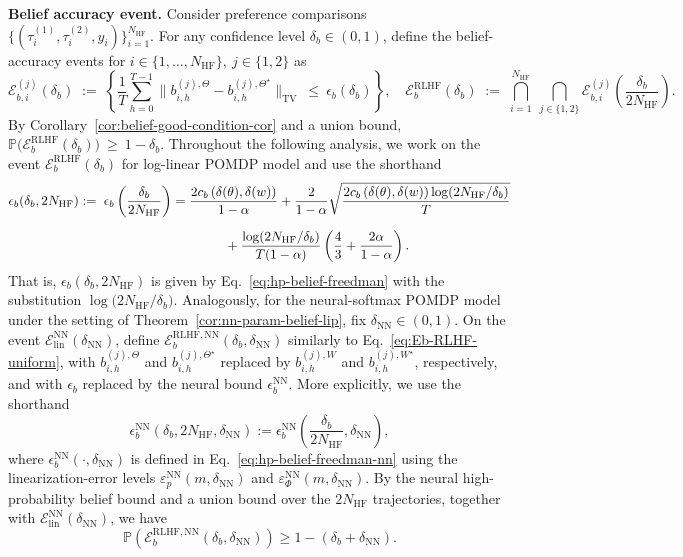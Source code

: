 \documentclass[10pt]{article} %
\theoremstyle{plain}
\theoremstyle{definition}
\theoremstyle{remark}
\newcommand{\bP}{\mathbb{P}}
\begin{document}
\textbf{Belief accuracy event.}
Consider preference comparisons $\{(\tau_i^{(1)},\tau_i^{(2)},y_i)\}_{i=1}^{N_{\mathrm{HF}}}$. For any confidence level $\delta_b\in(0,1)$, define the belief-accuracy events for $i\in\{1,\dots,N_{\mathrm{HF}}\},\ j\in\{1,2\}$ as
\begin{equation}\label{eq:Eb-RLHF-uniform}
\mathcal E_{b,i}^{(j)}(\delta_b)\;:=\;\left\{\frac{1}{T}\sum_{h=0}^{T-1}
\bigl\|b_{i,h}^{(j),\Theta}-b_{i,h}^{(j),\Theta^\star}\bigr\|_{\mathrm{TV}}
\ \le\ \epsilon_b(\delta_b)\right\},\quad \mathcal E_{b}^{\mathrm{RLHF}}(\delta_b)\;:=\;\bigcap_{i=1}^{N_{\mathrm{HF}}}\ \bigcap_{j\in\{1,2\}}
\mathcal E_{b,i}^{(j)} \left(\frac{\delta_b}{2N_{\mathrm{HF}}}\right).
\end{equation}
By Corollary~\ref{cor:belief-good-condition-cor} and a union bound,
\(
\bP\bigl(\mathcal E_{b}^{\mathrm{RLHF}}(\delta_b)\bigr)\ \ge\ 1-\delta_b.
\)
Throughout the following analysis, we work on the event $\mathcal E_{b}^{\mathrm{RLHF}}(\delta_b)$ for log-linear POMDP model and use the shorthand
\begin{align}\label{eq:eps-b-bar-def}
\epsilon_b(\delta_b, 2N_{\mathrm{HF}}):=\;\epsilon_b \left(\frac{\delta_b}{2N_{\mathrm{HF}}}\right)&=\frac{2c_b\,(\delta(\theta),\delta(w))}{1-\alpha}+ \frac{2}{1-\alpha}\sqrt{\frac{2 c_b\,(\delta(\theta),\delta(w)) \log(2N_{\mathrm{HF}}/\delta_b)}{T}}\notag\\[6pt]
&\qquad\qquad+\frac{\log(2N_{\mathrm{HF}}/\delta_b)}{T(1-\alpha)}\left(\frac{4}{3}+ \frac{2\alpha}{1-\alpha}\right).
\end{align}
That is, $\epsilon_b(\delta_b, 2N_{\mathrm{HF}})$ is given by Eq.~\ref{eq:hp-belief-freedman} with the substitution
$\log\bigl(2N_{\mathrm{HF}}/\delta_b\bigr)$. Analogously, for the neural-softmax POMDP model under the setting of Theorem~\ref{cor:nn-param-belief-lip}, fix \(\delta_{\mathrm{NN}}\in(0,1)\). On the event \(\mathcal E_{\mathrm{lin}}^{\mathrm{NN}}(\delta_{\mathrm{NN}})\), define \(\mathcal E_{b}^{\mathrm{RLHF},\mathrm{NN}}(\delta_b,\delta_{\mathrm{NN}})\) similarly to Eq.~\ref{eq:Eb-RLHF-uniform}, with \(b_{i,h}^{(j),\Theta}\) and \(b_{i,h}^{(j),\Theta^\star}\) replaced by \(b_{i,h}^{(j),W}\) and \(b_{i,h}^{(j),W^\star}\), respectively, and with \(\epsilon_b\) replaced by the neural bound \(\epsilon_b^{\mathrm{NN}}\). More explicitly, we use the shorthand
\[
\epsilon_b^{\mathrm{NN}}(\delta_b,2N_{\mathrm{HF}},\delta_{\mathrm{NN}})
:=\epsilon_b^{\mathrm{NN}}\!\left(\frac{\delta_b}{2N_{\mathrm{HF}}},\delta_{\mathrm{NN}}\right),
\]
where \(\epsilon_b^{\mathrm{NN}}(\cdot,\delta_{\mathrm{NN}})\) is defined in Eq.~\ref{eq:hp-belief-freedman-nn} using the linearization-error levels
\(\varepsilon_p^{\mathrm{NN}}(m,\delta_{\mathrm{NN}})\) and
\(\varepsilon_\Phi^{\mathrm{NN}}(m,\delta_{\mathrm{NN}})\). By the neural high-probability belief bound and a union bound over the \(2N_{\mathrm{HF}}\) trajectories, together with \(\mathcal E_{\mathrm{lin}}^{\mathrm{NN}}(\delta_{\mathrm{NN}})\), we have
\[
\bP\!\left(\mathcal E_{b}^{\mathrm{RLHF},\mathrm{NN}}(\delta_b,\delta_{\mathrm{NN}})\right)
\ge 1-(\delta_b+\delta_{\mathrm{NN}}).
\]
\end{document}

